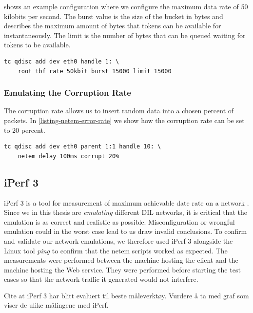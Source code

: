  shows an example configuration where we configure
the maximum data rate of 50 kilobits per second. The burst value is the size of
the bucket in bytes and describes the maximum amount of bytes that tokens can be
available for instantaneously. The limit is the number of bytes that can be queued
waiting for tokens to be available.

\begin{lstlisting}[frame=single, caption="Emulating data rate", label=listing-netem-data-rate]
  tc qdisc add dev eth0 handle 1: \
    root tbf rate 50kbit burst 15000 limit 15000
\end{lstlisting}

\subsubsection{Emulating the Corruption Rate}

The corruption rate allows us to insert random data into a chosen percent of
packets. In \cref{listing-netem-error-rate} we show how the corruption rate can
be set to 20 percent.

\begin{lstlisting}[frame=single, caption="Emulating corruption rate", label=listing-netem-error-rate]
  tc qdisc add dev eth0 parent 1:1 handle 10: \
    netem delay 100ms corrupt 20%
\end{lstlisting}


\subsection{iPerf 3}

iPerf 3 is a tool for measurement of maximum achievable date rate on a
network \cite{iperf3-homepage}. Since we in this thesis are \textit{emulating}
different DIL networks, it is critical that the emulation is as correct and
realistic as possible. Misconfiguration or wrongful emulation could in the worst
case lead to us draw invalid conclusions. To confirm and validate our network
emulations, we therefore used iPerf 3 alongside the Linux tool \textit{ping} to
confirm that the \gls{netem} scripts worked as expected. The measurements were
performed between the machine hosting the client and the machine hosting the Web
service. They were performed before starting the test cases so that the network
traffic it generated would not interfere.

Cite at iPerf 3 har blitt evaluert til beste måleverktøy. Vurdere å ta med graf som viser de ulike målingene med iPerf.

